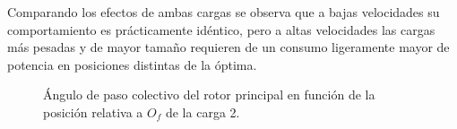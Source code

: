 Comparando los efectos de ambas cargas se observa que a bajas velocidades su comportamiento es prácticamente idéntico, pero a altas velocidades las cargas más pesadas y de mayor tamaño requieren de un consumo ligeramente mayor de potencia en posiciones distintas de la óptima.

\begin{figure}
	\centering
	\caption{Ángulo de paso colectivo del rotor principal en función de la posición relativa a $O_f$ de la carga 2.}
	\label{theta0VH2lxy}
\end{figure}
